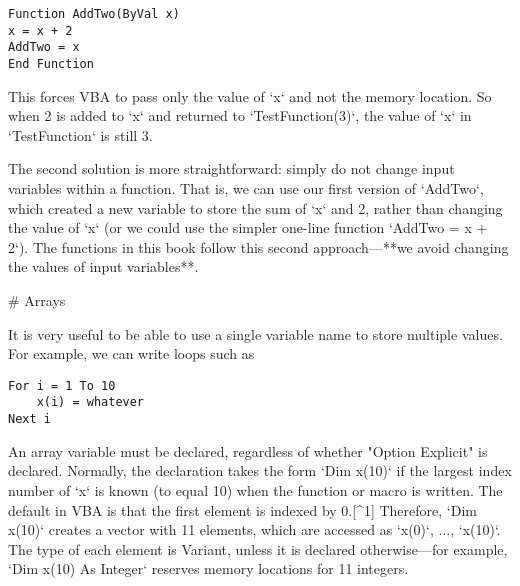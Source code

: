 \small\begin{verbatim}
Function AddTwo(ByVal x)
x = x + 2
AddTwo = x
End Function
\end{verbatim}\normalsize
This forces VBA to pass only the value of `x` and not the memory
location. So when 2 is added to `x` and returned to `TestFunction(3)`,
the value of `x` in `TestFunction` is still 3.

The second solution is more straightforward: simply do not change input
variables within a function. That is, we can use our first version of
`AddTwo`, which created a new variable to store the sum of `x` and 2,
rather than changing the value of `x` (or we could use the simpler
one-line function `AddTwo = x + 2`). The functions in this book follow
this second approach---**we avoid changing the values of input
variables**.

# Arrays


It is very useful to be able to use a single variable name to store multiple values.  For example, we can write loops such as
\small\begin{verbatim}
For i = 1 To 10
    x(i) = whatever
Next i
\end{verbatim}\normalsize
An array variable must be declared, regardless of whether "Option
Explicit" is declared. Normally, the declaration takes the form
`Dim x(10)` if the largest index number of `x` is known (to equal 10)
when the function or macro is written. The default in VBA is that the
first element is indexed by 0.[^1] Therefore, `Dim x(10)` creates a
vector with 11 elements, which are accessed as `x(0)`, ..., `x(10)`. The
type of each element is Variant, unless it is declared otherwise---for
example, `Dim x(10) As Integer` reserves memory locations for 11
integers.

